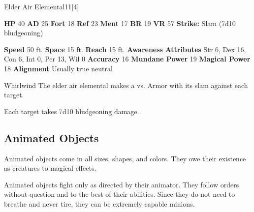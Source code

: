   \begin{monsubsection}{Elder Air Elemental}{11}[4]
    \vspace{-1em}\vspace{-1em}
    \vspace{0em}

    
    

    \begin{spellcontent}
      \begin{spelltargetinginfo}
        \pari \textbf{HP} 40 \monsep
          \textbf{AD} 25 \monsep
          \textbf{Fort} 18 \monsep
          \textbf{Ref} 23 \monsep
          \textbf{Ment} 17
        \pari \textbf{BR} 19 \monsep
        \textbf{VR} 57
        \pari \textbf{Strike:}
            Slam  (7d10 bludgeoning)
      \end{spelltargetinginfo}
    \end{spellcontent}
    \begin{monsterfooter}
      \pari \textbf{Speed} 50 ft. \monsep
        \textbf{Space} 15 ft. \monsep
        \textbf{Reach} 15 ft.
      \pari \textbf{Awareness} 
      \pari \textbf{Attributes}
        Str 6, Dex 16,
        Con 6, Int 0,
        Per 13, Wil 0
      \pari \textbf{Accuracy} 16 \monsep
        \textbf{Mundane Power} 19 \monsep
      \textbf{Magical Power} 18
      \pari \textbf{Alignment} Usually true neutral
    \end{monsterfooter}
  \end{monsubsection}
  \begin{freeability}{Whirlwind}
       The elder air elemental makes a 
         vs. Armor
        with its slam against each target.
    
    \hit Each target takes 7d10 bludgeoning damage.
    \end{freeability}
  
  
    \subsection{Animated Objects}
      
      Animated objects come in all sizes, shapes, and colors.
      They owe their existence as creatures to magical effects.
    
      Animated objects fight only as directed by their animator.
      They follow orders without question and to the best of their abilities.
      Since they do not need to breathe and never tire, they can be extremely capable minions.
    

